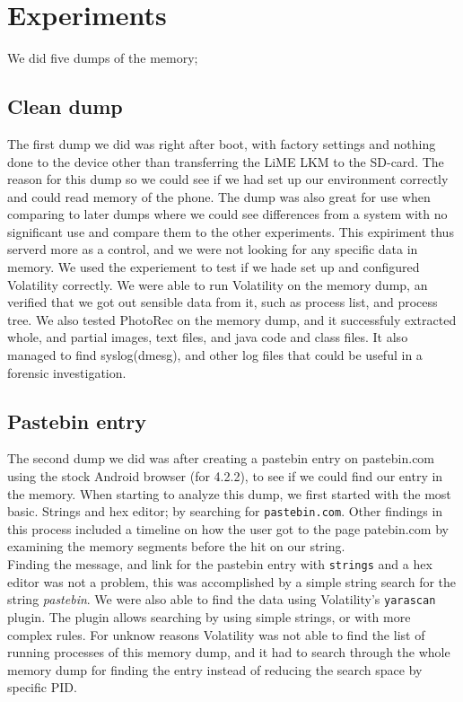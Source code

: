 \section{Experiments}
We did five dumps of the memory;
  \subsection{Clean dump}
The first dump we did was right after boot, with factory settings and nothing 
done to the device other than transferring the LiME LKM to the SD-card. The 
reason for this dump so we could see if we had set up our environment correctly 
and could read memory of the phone. The dump was also great for use when 
comparing to later dumps where we could see differences from a system with no 
significant use and compare them to the other experiments. This expiriment
thus serverd more as a control, and we were not looking for any specific data in
memory. We used the experiement to test if we hade set up and configured 
Volatility correctly. We were able to run Volatility on the memory dump, an 
verified that we got out sensible data from it, such as process list, and 
process tree. We also tested PhotoRec on the memory dump, and it successfuly
extracted whole, and partial images, text files, and java code and class files.
It also managed to find syslog(dmesg), and other log files that could be useful
in a forensic investigation.
  
\subsection{Pastebin entry}
The second dump we did was after creating a pastebin entry on pastebin.com using
the stock Android browser (for 4.2.2), to see if we could find our entry in the 
memory. When starting to analyze this dump, we first started with the most basic.
Strings and hex editor; by searching for \texttt{pastebin.com}. Other findings in
this process included a timeline on how the user got to the page patebin.com by 
examining the memory segments before the hit on our string.\\

Finding the message, and link for the pastebin entry with \texttt{strings} and a
hex editor was not a problem, this was accomplished by a simple string search for
the string \textit{pastebin}. We were also able to find the data using Volatility's
\texttt{yarascan} plugin. The plugin allows searching by using simple strings,
or with more complex rules. For unknow reasons Volatility was not able to find
the list of running processes of this memory dump, and it had to search through 
the whole memory dump for finding the entry instead of reducing the search space 
by specific PID. 
  
